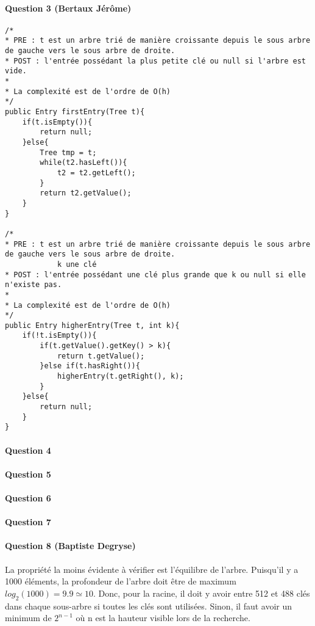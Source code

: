 \documentclass[a4paper]{article}
\begin{document}
\paragraph*{Question 3 (Bertaux Jérôme)}
\begin{verbatim}
/*
* PRE : t est un arbre trié de manière croissante depuis le sous arbre de gauche vers le sous arbre de droite.
* POST : l'entrée possédant la plus petite clé ou null si l'arbre est vide.
* 
* La complexité est de l'ordre de O(h)
*/
public Entry firstEntry(Tree t){
	if(t.isEmpty()){
		return null;
	}else{
		Tree tmp = t;
		while(t2.hasLeft()){
			t2 = t2.getLeft();		
		}
		return t2.getValue();	
	}
}

/*
* PRE : t est un arbre trié de manière croissante depuis le sous arbre de gauche vers le sous arbre de droite.
			k une clé
* POST : l'entrée possédant une clé plus grande que k ou null si elle n'existe pas.
* 
* La complexité est de l'ordre de O(h)
*/
public Entry higherEntry(Tree t, int k){
	if(!t.isEmpty()){
		if(t.getValue().getKey() > k){
			return t.getValue();		
		}else if(t.hasRight()){
			higherEntry(t.getRight(), k);		
		}	
	}else{
		return null;	
	}
}
\end{verbatim}

\paragraph*{Question 4}
\paragraph*{Question 5}
\paragraph*{Question 6}
\paragraph*{Question 7}
\paragraph*{Question 8 (Baptiste Degryse)}
La propriété la moins évidente à vérifier est l'équilibre de l'arbre. Puisqu'il y a 1000 éléments, la profondeur de l'arbre doit être de maximum $log_2(1000) = 9.9 \simeq 10 $. Donc, pour la racine, il doit y avoir entre 512 et 488 clés dans chaque sous-arbre si toutes les clés sont utilisées. Sinon, il faut avoir un minimum de $2^{n-1}$ où n est la hauteur visible lors de la recherche.
\end{document}
